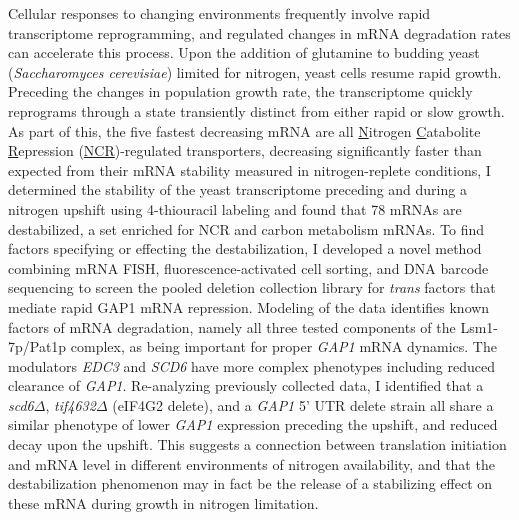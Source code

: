 \documentclass[12pt,letterpaper]{memoir}
\begin{document}
Cellular responses to changing environments frequently involve rapid
transcriptome reprogramming, and regulated changes in mRNA 
degradation rates can accelerate this process.
Upon the addition of glutamine to budding yeast 
(\textit{Saccharomyces cerevisiae}) limited for nitrogen,
yeast cells resume rapid growth. 
Preceding the changes in population growth rate,
the transcriptome quickly reprograms through a state transiently 
distinct from either rapid or slow growth.
As part of this,
the five fastest decreasing mRNA are all 
\underline{N}itrogen \underline{C}atabolite \underline{R}epression 
(\underline{NCR})-regulated transporters, decreasing 
significantly faster than expected from their mRNA 
stability measured in nitrogen-replete conditions, 
I determined the stability of the yeast transcriptome 
preceding and during a nitrogen upshift using 
4-thiouracil labeling and found that 78 mRNAs are destabilized,
a set enriched for NCR and carbon metabolism mRNAs.
To find factors specifying or effecting the destabilization, I
developed a novel method combining mRNA FISH, fluorescence-activated
cell sorting, and DNA barcode sequencing to screen the pooled deletion
collection library for \textit{trans} factors that mediate rapid GAP1 mRNA
repression. 
Modeling of the data identifies known factors of mRNA
degradation, namely all three tested components of the
Lsm1-7p/Pat1p complex, as being important for proper \textit{GAP1}
mRNA dynamics. The modulators \textit{EDC3} and \textit{SCD6}
have more complex phenotypes including reduced clearance of
\textit{GAP1}. Re-analyzing previously collected data,
I identified that a \textit{scd6}$\Delta$, \textit{tif4632}$\Delta$
(eIF4G2 delete), and a \textit{GAP1} 5' UTR delete strain all
share a similar phenotype of lower \textit{GAP1} expression preceding
the upshift, and reduced decay upon the upshift. This suggests a
connection between translation initiation and mRNA level in different
environments of nitrogen availability, and that the destabilization 
phenomenon may in fact be the release of a stabilizing effect on these 
mRNA during growth in nitrogen limitation.

\newpage

{\SingleSpacing
\tableofcontents}

\listoffigures

\mainmatter







\SingleSpacing

\printbibliography[heading=bibintoc,title={References}]
\end{document}
